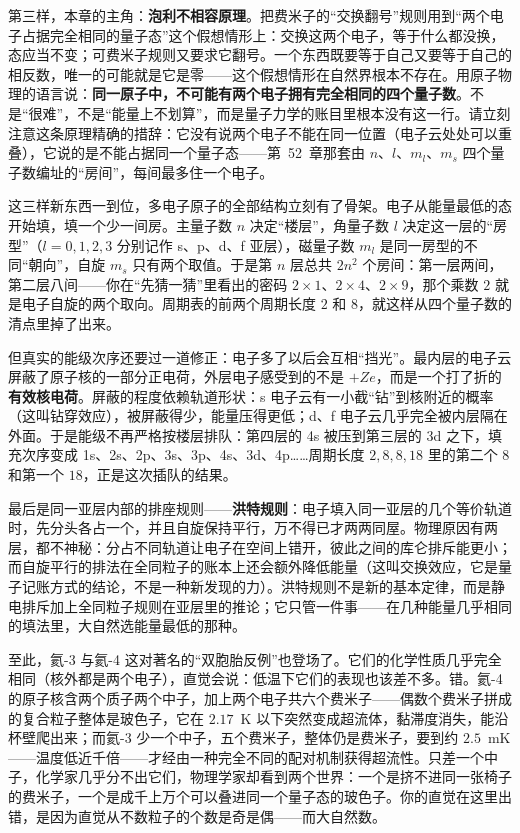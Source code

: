 第三样，本章的主角：\textbf{泡利不相容原理}。把费米子的“交换翻号”规则用到“两个电子占据完全相同的量子态”这个假想情形上：交换这两个电子，等于什么都没换，态应当不变；可费米子规则又要求它翻号。一个东西既要等于自己又要等于自己的相反数，唯一的可能就是它是零——这个假想情形在自然界根本不存在。用原子物理的语言说：\textbf{同一原子中，不可能有两个电子拥有完全相同的四个量子数}。不是“很难”，不是“能量上不划算”，而是量子力学的账目里根本没有这一行。请立刻注意这条原理精确的措辞：它没有说两个电子不能在同一位置（电子云处处可以重叠），它说的是不能占据同一个量子态——第~52~章那套由 \(n\)、\(l\)、\(m_l\)、\(m_s\) 四个量子数编址的“房间”，每间最多住一个电子。

这三样新东西一到位，多电子原子的全部结构立刻有了骨架。电子从能量最低的态开始填，填一个少一间房。主量子数 \(n\) 决定“楼层”，角量子数 \(l\) 决定这一层的“房型”（\(l=0,1,2,3\) 分别记作 s、p、d、f 亚层），磁量子数 \(m_l\) 是同一房型的不同“朝向”，自旋 \(m_s\) 只有两个取值。于是第 \(n\) 层总共 \(2n^2\) 个房间：第一层两间，第二层八间——你在“先猜一猜”里看出的密码 \(2\times1\)、\(2\times4\)、\(2\times9\)，那个乘数 \(2\) 就是电子自旋的两个取向。周期表的前两个周期长度 \(2\) 和 \(8\)，就这样从四个量子数的清点里掉了出来。

但真实的能级次序还要过一道修正：电子多了以后会互相“挡光”。最内层的电子云屏蔽了原子核的一部分正电荷，外层电子感受到的不是 \(+Ze\)，而是一个打了折的\textbf{有效核电荷}。屏蔽的程度依赖轨道形状：s 电子云有一小截“钻”到核附近的概率（这叫钻穿效应），被屏蔽得少，能量压得更低；d、f 电子云几乎完全被内层隔在外面。于是能级不再严格按楼层排队：第四层的 4s 被压到第三层的 3d 之下，填充次序变成 1s、2s、2p、3s、3p、4s、3d、4p……周期长度 \(2,8,8,18\) 里的第二个 \(8\) 和第一个 \(18\)，正是这次插队的结果。

最后是同一亚层内部的排座规则——\textbf{洪特规则}：电子填入同一亚层的几个等价轨道时，先分头各占一个，并且自旋保持平行，万不得已才两两同屋。物理原因有两层，都不神秘：分占不同轨道让电子在空间上错开，彼此之间的库仑排斥能更小；而自旋平行的排法在全同粒子的账本上还会额外降低能量（这叫交换效应，它是量子记账方式的结论，不是一种新发现的力）。洪特规则不是新的基本定律，而是静电排斥加上全同粒子规则在亚层里的推论；它只管一件事——在几种能量几乎相同的填法里，大自然选能量最低的那种。

至此，氦-3 与氦-4 这对著名的“双胞胎反例”也登场了。它们的化学性质几乎完全相同（核外都是两个电子），直觉会说：低温下它们的表现也该差不多。错。氦-4 的原子核含两个质子两个中子，加上两个电子共六个费米子——偶数个费米子拼成的复合粒子整体是玻色子，它在 \(2.17\)~K 以下突然变成超流体，黏滞度消失，能沿杯壁爬出来；而氦-3 少一个中子，五个费米子，整体仍是费米子，要到约 \(2.5\)~mK——温度低近千倍——才经由一种完全不同的配对机制获得超流性。只差一个中子，化学家几乎分不出它们，物理学家却看到两个世界：一个是挤不进同一张椅子的费米子，一个是成千上万个可以叠进同一个量子态的玻色子。你的直觉在这里出错，是因为直觉从不数粒子的个数是奇是偶——而大自然数。


